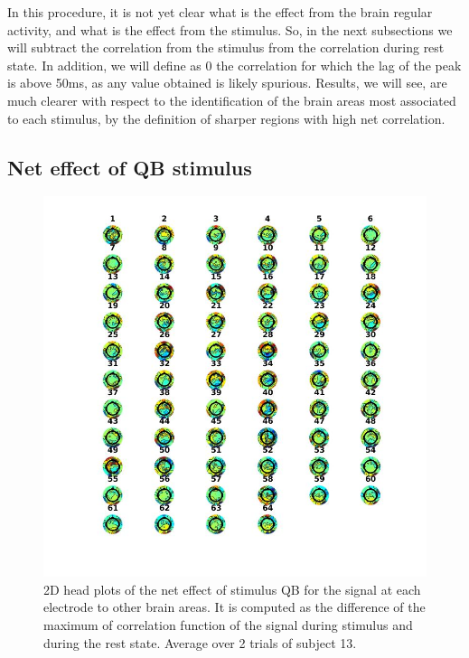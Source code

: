 \documentclass[a4paper]{article}
\begin{document}
\newpage

In this procedure, it is not yet clear what is the effect from the brain regular activity, and what is the effect from the stimulus. So, in the next subsections we will subtract the correlation from the stimulus from the correlation during rest state. In addition, we will define as 0 the correlation for which the lag of the peak is above 50ms, as any value obtained is likely spurious. Results, we will see, are much clearer with respect to the identification of the brain areas most associated to each stimulus, by the definition of sharper regions with high net correlation.

\subsection{Net effect of QB stimulus}

\begin{figure}[H]
    \centering
    \includegraphics[width=16cm]{QB1.jpg}
    \caption{2D head plots of the net effect of stimulus QB for the signal at each electrode to other brain areas. It is computed as the difference of the maximum of correlation function of the signal during stimulus and during the rest state. Average over 2 trials of subject 13.}
    \label{fig:qb1}
\end{figure}
\end{document}

